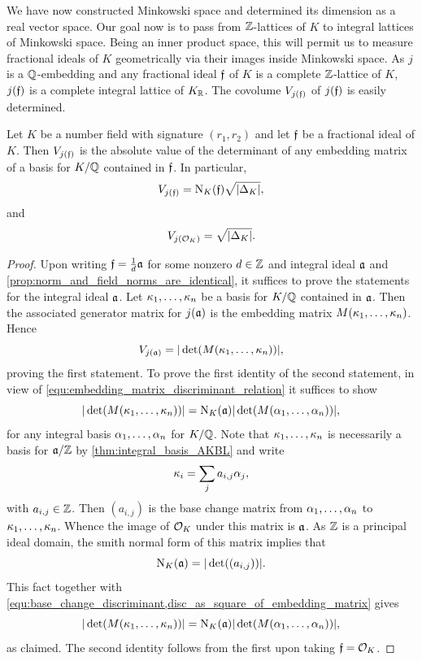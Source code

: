     We have now constructed Minkowski space and determined its dimension as a real vector space. Our goal now is to pass from \(\mathbb{Z}\)-lattices of \(K\) to integral lattices of Minkowski space. Being an inner product space, this will permit us to measure fractional ideals of \(K\) geometrically via their images inside Minkowski space. As \(j\) is a \(\mathbb{Q}\)-embedding and any fractional ideal \(\mathfrak{f}\) of \(K\) is a complete \(\mathbb{Z}\)-lattice of \(K\), \(j(\mathfrak{f})\) is a complete integral lattice of \(K_{\mathbb{R}}\). The covolume \(V_{j(\mathfrak{f})}\) of \(j(\mathfrak{f})\) is easily determined.

    \begin{proposition}\label{prop:covolume_of_fractional_ideal_under_j}
      Let \(K\) be a number field with signature \((r_{1},r_{2})\) and let \(\mathfrak{f}\) be a fractional ideal of \(K\). Then \(V_{j(\mathfrak{f})}\) is the absolute value of the determinant of any embedding matrix of a basis for \(K/\mathbb{Q}\) contained in \(\mathfrak{f}\). In particular,
      \[
        V_{j(\mathfrak{f})} = \operatorname{\mathrm{N}}_{K}(\mathfrak{f})\sqrt{|\Delta_{K}|},
      \]
      and
      \[
        V_{j(\mathcal{O}_{K})} = \sqrt{|\Delta_{K}|}.
      \]
    \end{proposition}
    \begin{proof}
      Upon writing \(\mathfrak{f} = \frac{1}{d}\mathfrak{a}\) for some nonzero \(d \in \mathbb{Z}\) and integral ideal \(\mathfrak{a}\) and \cref{prop:norm_and_field_norms_are_identical}, it suffices to prove the statements for the integral ideal \(\mathfrak{a}\). Let \(\kappa_{1},\ldots,\kappa_{n}\) be a basis for \(K/\mathbb{Q}\) contained in \(\mathfrak{a}\). Then the associated generator matrix for \(j(\mathfrak{a})\) is the embedding matrix \(M(\kappa_{1},\ldots,\kappa_{n})\). Hence
      \[
        V_{j(\mathfrak{a})} = |\det(M(\kappa_{1},\ldots,\kappa_{n}))|,
      \]
      proving the first statement. To prove the first identity of the second statement, in view of \cref{equ:embedding_matrix_discriminant_relation} it suffices to show
      \[
        |\det(M(\kappa_{1},\ldots,\kappa_{n}))| = \operatorname{\mathrm{N}}_{K}(\mathfrak{a})|\det(M(\alpha_{1},\ldots,\alpha_{n}))|,
      \]
      for any integral basis \(\alpha_{1},\ldots,\alpha_{n}\) for \(K/\mathbb{Q}\). Note that \(\kappa_{1},\ldots,\kappa_{n}\) is necessarily a basis for \(\mathfrak{a}/\mathbb{Z}\) by \cref{thm:integral_basis_AKBL} and write
      \[
        \kappa_{i} = \sum_{j}a_{i,j}\alpha_{j},
      \]
      with \(a_{i,j} \in \mathbb{Z}\). Then \((a_{i,j})\) is the base change matrix from \(\alpha_{1},\ldots,\alpha_{n}\) to \(\kappa_{1},\ldots,\kappa_{n}\). Whence the image of \(\mathcal{O}_{K}\) under this matrix is \(\mathfrak{a}\). As \(\mathbb{Z}\) is a principal ideal domain, the smith normal form of this matrix implies that
      \[
        \operatorname{\mathrm{N}}_{K}(\mathfrak{a}) = |\det((a_{i,j}))|.
      \]
      This fact together with \cref{equ:base_change_discriminant,disc_as_square_of_embedding_matrix} gives
      \[
        |\det(M(\kappa_{1},\ldots,\kappa_{n}))| = \operatorname{\mathrm{N}}_{K}(\mathfrak{a})|\det(M(\alpha_{1},\ldots,\alpha_{n}))|,
      \]
      as claimed. The second identity follows from the first upon taking \(\mathfrak{f} = \mathcal{O}_{K}\).
    \end{proof}
    
